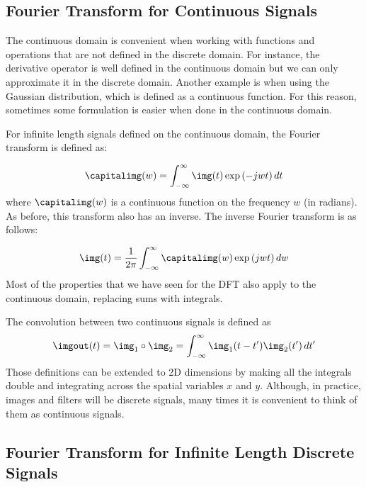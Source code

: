 \subsection{Fourier Transform for Continuous Signals}

The continuous domain is convenient when working with functions and operations that are not defined in the discrete domain. For instance, the derivative operator is well defined in the continuous domain but we can only approximate it in the discrete domain. Another example is when using the Gaussian distribution, which is defined as a continuous function. For this reason, sometimes some formulation is easier when done in the continuous domain.

For infinite length signals defined on the continuous domain, the Fourier transform is defined as:

\begin{equation}
	\capitalimg (w) =  \int_{-\infty}^{\infty} \img (t) \exp{ \left( - j w t \right)} \, dt
	\label{eq:contfourier}
\end{equation}
where $\capitalimg (w)$ is a continuous function on the frequency $w$ (in radians). As before, this transform also has an inverse. The inverse Fourier transform is as follows:

\begin{equation}
	\img (t) = \frac{1}{2 \pi} \int_{-\infty}^{\infty} \capitalimg (w) \exp{ \left( j w t \right) } \, dw
	\label{eq:invcontfourier}
\end{equation}
Most of the properties that we have seen for the DFT also apply to the continuous domain, replacing sums with integrals.

The convolution between two continuous signals is defined as
\begin{equation}
	\imgout (t) =  \img_1 \circ \img_2 = \int_{-\infty}^{\infty} \img_1 (t-t') \img_2(t') \, d t'
	\label{eq:contconv}
\end{equation}
Those definitions can be extended to 2D dimensions by making all the integrals double and integrating across the spatial variables $x$ and $y$. Although, in practice, images and filters will be discrete signals, many times it is convenient to think of them as continuous signals.



\subsection{Fourier Transform for Infinite Length Discrete Signals}

